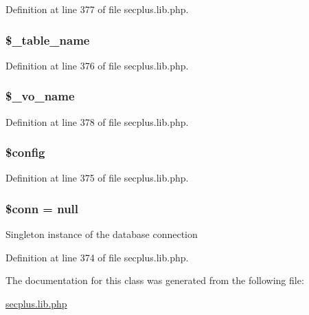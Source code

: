 Definition at line 377 of file secplus.lib.php.

\hypertarget{class_sec_plus_1_1_abstract_model_a90ebc25e748e2696e00b5c5cf3255ee4}{
\subsubsection[{\$\_\-table\_\-name}]{\setlength{\rightskip}{0pt plus 5cm}\$\_\-table\_\-name}}
\label{class_sec_plus_1_1_abstract_model_a90ebc25e748e2696e00b5c5cf3255ee4}


Definition at line 376 of file secplus.lib.php.

\hypertarget{class_sec_plus_1_1_abstract_model_a384569b1003a994ec59b73fdaa7bd0b3}{
\subsubsection[{\$\_\-vo\_\-name}]{\setlength{\rightskip}{0pt plus 5cm}\$\_\-vo\_\-name}}
\label{class_sec_plus_1_1_abstract_model_a384569b1003a994ec59b73fdaa7bd0b3}


Definition at line 378 of file secplus.lib.php.

\hypertarget{class_sec_plus_1_1_abstract_model_a49c7011be9c979d9174c52a8b83e5d8e}{
\subsubsection[{\$config}]{\setlength{\rightskip}{0pt plus 5cm}\$config}}
\label{class_sec_plus_1_1_abstract_model_a49c7011be9c979d9174c52a8b83e5d8e}


Definition at line 375 of file secplus.lib.php.

\hypertarget{class_sec_plus_1_1_abstract_model_aa8a5a87b9c1a6a0819b88447cbe41877}{
\subsubsection[{\$conn}]{\setlength{\rightskip}{0pt plus 5cm}\$conn = null}}
\label{class_sec_plus_1_1_abstract_model_aa8a5a87b9c1a6a0819b88447cbe41877}
Singleton instance of the database connection 

Definition at line 374 of file secplus.lib.php.



The documentation for this class was generated from the following file:\begin{DoxyCompactItemize}
\item 
\hyperlink{secplus_8lib_8php}{secplus.lib.php}\end{DoxyCompactItemize}
